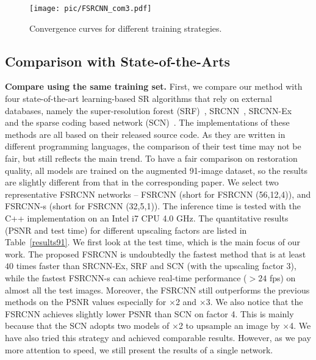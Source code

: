 \documentclass[runningheads]{llncs}
\begin{document}
\begin{figure}[t]\footnotesize
\centering
  \texttt{[image: pic/FSRCNN\_com3.pdf]}
\caption{Convergence curves for different training strategies.}
\label{fig:upscalingfactor}
\end{figure}




\subsection{Comparison with State-of-the-Arts}
\label{subsec:sota}


\textbf{Compare using the same training set.} First, we compare our method with four state-of-the-art learning-based SR algorithms that rely on external databases, namely the super-resolution forest (SRF)~\cite{Schulter2015}, SRCNN~\cite{Dong2014}, SRCNN-Ex~\cite{Dong2015} and the sparse coding based network (SCN)~\cite{Wang2015}. The implementations of these methods are all based on their released source code. As they are written in different programming languages, the comparison of their test time may not be fair, but still reflects the main trend. To have a fair comparison on restoration quality, all models are trained on the augmented 91-image dataset, so the results are slightly different from that in the corresponding paper. We select two representative FSRCNN networks -- FSRCNN (short for FSRCNN (56,12,4)), and FSRCNN-s (short for FSRCNN (32,5,1)). The inference time is tested with the C++ implementation on an Intel i7 CPU 4.0 GHz.
The quantitative results (PSNR and test time) for different upscaling factors are listed in Table~\ref{results91}. We first look at the test time, which is the main focus of our work. The proposed FSRCNN is undoubtedly the fastest method that is at least $40$ times faster than SRCNN-Ex, SRF and SCN (with the upscaling factor 3),  while the fastest FSRCNN-s can achieve real-time performance ($>24$ fps) on almost all the test images. Moreover, the FSRCNN still outperforms the previous methods on the PSNR values especially for $\times$2 and $\times$3. We also notice that the FSRCNN achieves slightly lower PSNR than SCN on factor 4. This is mainly because that the SCN adopts two models of $\times$2 to upsample an image by $\times$4. We have also tried this strategy and achieved comparable results. However, as we pay more attention to speed, we still present the results of a single network.
\end{document}
